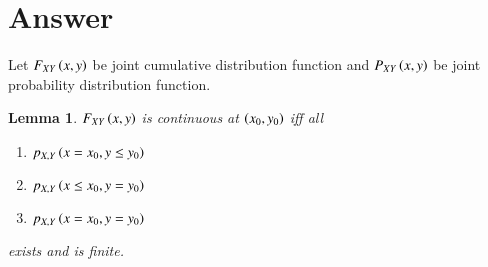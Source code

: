 \documentclass[journal,12pt,twocolumn]{IEEEtran}
\newtheorem{lemma}[theorem]{Lemma}
\begin{document}
\section{Answer}
Let $F_{XY}\left(x,y\right)$ be joint cumulative distribution function and $P_{XY}\left(x,y\right)$ be joint probability distribution function.\\
\begin{lemma}
$F_{XY}\left(x,y\right)$ is continuous at $\left(x_0,y_0\right)$ iff all
\begin{enumerate}
\item $p_{X,Y}\left(x=x_0,y \leq y_0\right)$
\item $p_{X,Y}\left(x \leq x_0,y = y_0\right)$
\item $p_{X,Y}\left(x=x_0,y = y_0\right)$
\end{enumerate}
exists and is finite.
\end{lemma}
\end{document}
